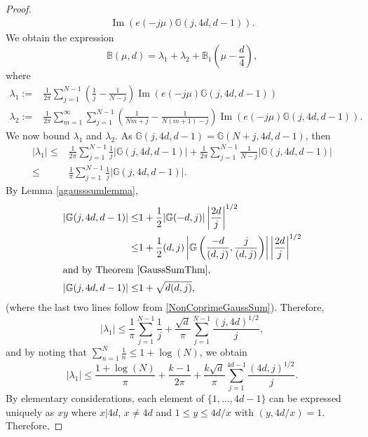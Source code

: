 \documentclass[12pt, a4paper]{article}
\newcommand{\BB}{\mathbb{B}}
\newcommand{\GG}{\mathbb{G}}
\newcommand{\opn}{\operatorname}
\begin{document}
\begin{proof}
\begin{align*}
    \opn{Im} \left ( e(-j \mu) \GG(j, 4d, d-1) \right ).
    \end{align*}
We obtain the expression 
  \[
  \BB(\mu, d) =  \lambda_1 + \lambda_2 + \BB_1\left ( \mu - \frac{d}{4} \right ),
  \]
  where
  \begin{align*}
  \lambda_1 := &
    \frac{1}{2 \pi} \sum_{j=1}^{N-1} \left ( \frac{1}{j} - \frac{1}{N-j} \right)
    \opn{Im}( e(-j \mu) \GG(j, 4d, d-1)) \\
\lambda_2 := &
    \frac{1}{2 \pi} \sum_{m=1}^{\infty} \sum_{j=1}^{N-1}
    \left ( \frac{1}{Nm + j }  - \frac{1}{N(m+1) - j} \right )
    \opn{Im} (e(-j \mu) \GG(j, 4d, d-1)).
  \end{align*}
  We now bound $\lambda_1$ and $\lambda_2$.
  As $\GG(j, 4d, d-1) = \GG( N+j, 4d, d-1)$, then 
  \begin{align*}
    \vert \lambda_1 \vert \leq &
    \frac{1}{2 \pi} \sum_{j=1}^{N-1} \frac{1}{j} \vert \GG(j, 4d, d-1) \vert
    +
    \frac{1}{2 \pi} \sum_{j=1}^{N-1} \frac{1}{N-j} \vert \GG(j, 4d, d-1) \vert \\
    \leq & \frac{1}{\pi} \sum_{j=1}^{N-1} \frac{1}{j} \vert \GG(j, 4d, d-1) \vert.
  \end{align*}
  By Lemma \ref{agausssumlemma},
  \begin{align}
    \vert \GG(j, 4d, d-1) \vert
    \leq & 1 + \frac{1}{2}\vert \GG(-d, j)  \vert \left \vert \frac{2d}{j} \right \vert^{1/2} \nonumber \\
    \leq & 1 + \frac{1}{2} (d,j) \left \vert \GG \left ( \frac{-d}{(d,j)}, \frac{j}{(d,j)} \right ) \right \vert \left \vert \frac{2d}{j} \right \vert^{1/2} \nonumber \\
    \intertext{and by Theorem \ref{GaussSumThm},}
    \vert \GG(j, 4d, d-1) \vert \leq & 1 + \sqrt{d(d,j)}, \label{Gj4dBound}
    \end{align}
  (where the last two lines follow from \eqref{NonCoprimeGaussSum}).
  Therefore,
  \[
    \vert \lambda_1 \vert
    \leq  \frac{1}{\pi} \sum_{j=1}^{N-1} \frac{1}{j} + \frac{\sqrt{d}}{\pi} \sum_{j=1}^{N-1} \frac{ (j, 4d)^{1/2}}{j}, 
    \]
    and by noting that  $\sum_{n=1}^N \frac{1}{n} \leq 1 + \opn{log}(N)$, we obtain
    \[
    \vert \lambda_1 \vert
    \leq
    \frac{1 + \opn{log}(N)}{\pi} +
    \frac{k-1}{2 \pi} + 
    \frac{k \sqrt{d}}{\pi} \sum_{j=1}^{4d - 1} \frac{(4d, j)^{1/2}}{j}.
    \]
    By elementary considerations, each element of $\{1, \ldots, 4d-1 \}$ can be expressed uniquely as $xy$ where $x \vert 4d$, $x \neq 4d$ and $1 \leq y \leq 4d/x$ with $(y, 4d/x)=1$.
    Therefore, 

\end{proof}
\end{document}
